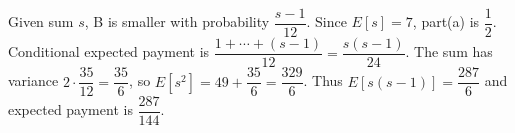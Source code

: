 Given sum $s$, B is smaller with probability $\dfrac{s-1}{12}$. Since $E[s]=7$, part(a) is $\boxed{\dfrac{1}{2}}$. Conditional expected payment is $\dfrac{1+\cdots+(s-1)}{12}=\dfrac{s(s-1)}{24}$. The sum has variance $2\cdot\dfrac{35}{12}=\dfrac{35}{6}$, so $E[s^2]=49+\dfrac{35}{6}=\dfrac{329}{6}$. Thus $E[s(s-1)]=\dfrac{287}{6}$ and expected payment is $\boxed{\dfrac{287}{144}}$.
